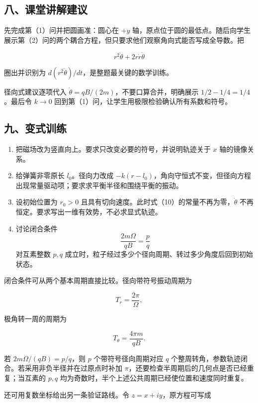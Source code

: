 \documentclass[12pt,a4paper,UTF8]{ctexart}
\newcommand{\tightlist}{\setlength{\itemsep}{0pt}\setlength{\parskip}{0pt}}
\begin{document}
\subsection{八、课堂讲解建议}\label{ux516bux8bfeux5802ux8bb2ux89e3ux5efaux8bae-3}

先完成第（1）问并把圆画准：圆心在 \(+y\)
轴，原点位于圆的最低点。随后向学生展示第（2）问的两个耦合方程，但只要求他们观察角向式能否写成全导数。把

\[r^2\ddot\theta+2r\dot r\dot\theta\]

圈出并识别为 \(d(r^2\dot\theta)/dt\)，是整题最关键的数学训练。

径向式建议逐项代入 \(\dot\theta=qB/(2m)\)，不要口算合并，明确展示
\(1/2-1/4=1/4\)。最后令 \(k\to0\)
回到第（1）问，让学生用极限检验确认所有系数和符号。

\subsection{九、变式训练}\label{ux4e5dux53d8ux5f0fux8badux7ec3-3}

\begin{enumerate}
\def\labelenumi{\arabic{enumi}.}
\tightlist
\item
  把磁场改为竖直向上。要求只改变必要的符号，并说明轨迹关于 \(x\)
  轴的镜像关系。
\item
  给弹簧非零原长 \(l_0\)。径向力改成
  \(-k(r-l_0)\)，角向守恒式不变，但径向方程出现常量驱动项；要求求平衡半径和围绕平衡的振动。
\item
  设初始位置为 \(r_0>0\)
  且具有切向速度。此时式（10）的常量不再为零，\(\dot\theta\)
  不再恒定。要求写出一维有效势，不必求显式轨迹。
\item
  讨论闭合条件 \[\frac{2m\Omega}{qB}=\frac pq\] 对互素整数 \(p,q\)
  成立时，粒子经过多少个径向周期、转过多少角度后回到初始状态。
\end{enumerate}

闭合条件可从两个基本周期直接比较。径向带符号振动周期为

\[T_r=\frac{2\pi}{\Omega},\]

极角转一周的周期为

\[T_\theta=\frac{4\pi m}{qB}.\]

若 \(2m\Omega/(qB)=p/q\)，则 \(p\) 个带符号径向周期对应 \(q\)
个整周转角，参数轨迹闭合。若采用非负半径并在过原点时补加
\(\pi\)，还要检查半周期后的几何点是否已经重复；当互素的 \(p,q\)
均为奇数时，半个上述公共周期已经使位置和速度同时重复。

还可用复数坐标给出另一条验证路线。令 \(z=x+iy\)，原方程可写成
\end{document}
